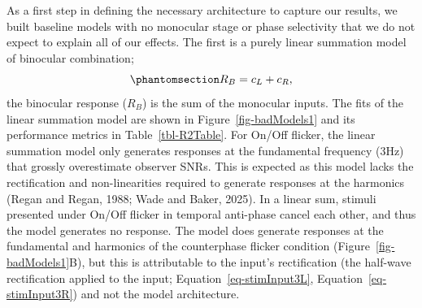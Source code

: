 \documentclass[
  12pt,
]{article}
\begin{document}
As a first step in defining the necessary architecture to capture our
results, we built baseline models with no monocular stage or phase
selectivity that we do not expect to explain all of our effects. The
first is a purely linear summation model of binocular combination;
\begin{equation}\phantomsection\label{eq-linearSumModel}{
R_B = c_L+c_R,
}\end{equation} the binocular response (\(R_B\)) is the sum of the
monocular inputs. The fits of the linear summation model are shown in
Figure~\ref{fig-badModels1} and its performance metrics in
Table~\ref{tbl-R2Table}. For On/Off flicker, the linear summation model
only generates responses at the fundamental frequency (3Hz) that grossly
overestimate observer SNRs. This is expected as this model lacks the
rectification and non-linearities required to generate responses at the
harmonics (Regan and Regan, 1988; Wade and Baker, 2025). In a linear
sum, stimuli presented under On/Off flicker in temporal anti-phase
cancel each other, and thus the model generates no response. The model
does generate responses at the fundamental and harmonics of the
counterphase flicker condition (Figure~\ref{fig-badModels1}B), but this
is attributable to the input's rectification (the half-wave
rectification applied to the input;
Equation~\ref{eq-stimInput3L}, Equation~\ref{eq-stimInput3R}) and not
the model architecture.
\end{document}
